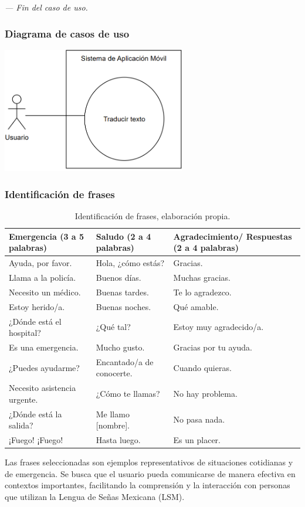 \textit{--- Fin del caso de uso.}


\subsubsection{Diagrama de casos de uso}
\begin{center}
    \includegraphics[width=0.6\textwidth]{Images/Cap 3/casodeuso.png}
\end{center}


\subsubsection{Identificación de frases}

\begin{table}[H]
\centering
\begin{tabularx}{\textwidth}{|X|X|X|}
\hline
\textbf{Emergencia (3 a 5 palabras)} & \textbf{Saludo (2 a 4 palabras)} & \textbf{Agradecimiento/ Respuestas (2 a 4 palabras)} \\ \hline
Ayuda, por favor. & Hola, ¿cómo estás? & Gracias. \\ \hline
Llama a la policía. & Buenos días. & Muchas gracias. \\ \hline
Necesito un médico. & Buenas tardes. & Te lo agradezco. \\ \hline
Estoy herido/a. & Buenas noches. & Qué amable. \\ \hline
¿Dónde está el hospital? & ¿Qué tal? & Estoy muy agradecido/a. \\ \hline
Es una emergencia. & Mucho gusto. & Gracias por tu ayuda. \\ \hline
¿Puedes ayudarme? & Encantado/a de conocerte. & Cuando quieras. \\ \hline
Necesito asistencia urgente. & ¿Cómo te llamas? & No hay problema. \\ \hline
¿Dónde está la salida? & Me llamo [nombre]. & No pasa nada. \\ \hline
¡Fuego! ¡Fuego! & Hasta luego. & Es un placer. \\ \hline
\end{tabularx}
\caption[Identificación de frases]{Identificación de frases, elaboración propia.}
\end{table}
Las frases seleccionadas son ejemplos representativos de situaciones cotidianas y de emergencia. Se busca que el usuario pueda comunicarse de manera efectiva en contextos importantes, facilitando la comprensión y la interacción con personas que utilizan la Lengua de Señas Mexicana (LSM).

